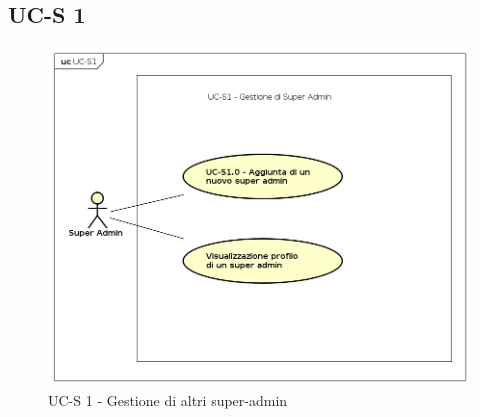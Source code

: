 \subsection{UC-S 1}
    \begin{figure}[h]
      \begin{center}
        \includegraphics[width=12cm]{res/img/UCSuperadmin/UCS1.png}
      \caption{UC-S 1 - Gestione di altri super-admin}
      \end{center} 
    \end{figure}    
    
